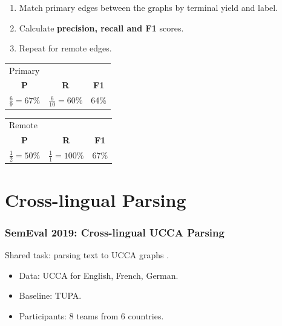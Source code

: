 \documentclass[t,xcolor={svgnames,table}]{beamer}
\begin{document}
\begin{frame}
\begin{adjustbox}{frame,scale=.75,center}
\end{adjustbox}
\vfill

\begin{enumerate}
  \item Match primary edges between the graphs by terminal yield and label.
  \item Calculate \textbf{precision, recall and F1} scores.
  \item Repeat for remote edges.
\end{enumerate}

\pause
\vfill
\begin{adjustbox}{center}
    \begin{tabular}{c|c|c}
        \multicolumn{3}{l}{Primary} \\
        \textbf{P} & \textbf{R} & \textbf{F1} \\ \hline
        $\frac69=67\%$ & $\frac6{10}=60\%$ & 64\%
    \end{tabular}
    \hspace{1cm}
    \begin{tabular}{c|c|c}
        \multicolumn{3}{l}{Remote} \\
        \textbf{P} & \textbf{R} & \textbf{F1} \\ \hline
        $\frac12=50\%$ & $\frac11=100\%$ & 67\%
    \end{tabular}
\end{adjustbox}
\end{frame}


\section{Cross-lingual Parsing}

\begin{frame}
\frametitle{SemEval 2019: Cross-lingual UCCA Parsing}
Shared task: parsing text to UCCA graphs \citep*{hershcovich2019shared}.
\begin{itemize}
\item Data: UCCA for English, French, German.
\item Baseline: TUPA.
\item Participants: 8 teams from 6 countries.
\end{itemize}
\end{frame}
\end{document}
